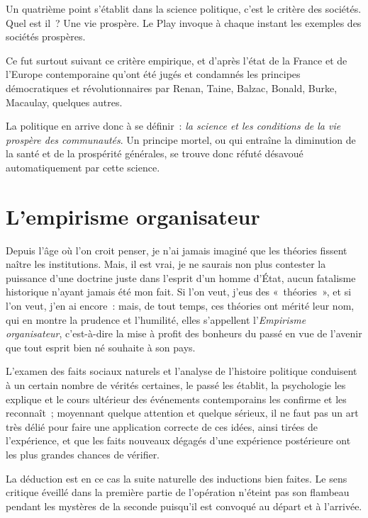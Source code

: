 \documentclass[french,twoside]{book} %
\newcommand{\astermono}{\medskip\centerline{\color{rubric}\large\selectfont{\syms ✻}}\medskip\par}%
\begin{document}
\astermono

\noindent Un quatrième point s’établit dans la science politique, c’est le critère des sociétés. Quel est il ? Une vie prospère. Le Play invoque à chaque instant les exemples des sociétés prospères.\par
Ce fut surtout suivant ce critère empirique, et d’après l’état de la France et de l’Europe contemporaine qu’ont été jugés et condamnés les principes démocratiques et révolutionnaires par Renan, Taine, Balzac, Bonald, Burke, Macaulay, quelques autres.\par
La politique en arrive donc à se définir : \emph{la science et les conditions de la vie prospère des communautés}. Un principe mortel, ou qui entraîne la diminution de la santé et de la prospérité générales, se trouve donc réfuté désavoué automatiquement par cette science.
\section[L’empirisme organisateur]{L’empirisme organisateur}
\noindent Depuis l’âge où l’on croit penser, je n’ai jamais imaginé que les théories fissent naître les institutions. Mais, il est vrai, je ne saurais non plus contester la puissance d’une doctrine juste dans l’esprit d’un homme d’État, aucun fatalisme historique n’ayant jamais été mon fait. Si l’on veut, j’eus des « théories », et si l’on veut, j’en ai encore : mais, de tout temps, ces théories ont mérité leur nom, qui en montre la prudence et l’humilité, elles s’appellent l’\emph{Empirisme organisateur}, c’est-à-dire la mise à profit des bonheurs du passé en vue de l’avenir que tout esprit bien né souhaite à son pays.\par
L’examen des faits sociaux naturels et l’analyse de l’histoire politique conduisent à un certain nombre de vérités certaines, le passé les établit, la psychologie les explique et le cours ultérieur des événements contemporains les confirme et les reconnaît ; moyennant quelque attention et quelque sérieux, il ne faut pas un art très délié pour faire une application correcte de ces idées, ainsi tirées de l’expérience, et que les faits nouveaux dégagés d’une expérience postérieure ont les plus grandes chances de vérifier.\par
La déduction est en ce cas la suite naturelle des inductions bien faites. Le sens critique éveillé dans la première partie de l’opération n’éteint pas son flambeau pendant les mystères de la seconde puisqu’il est convoqué au départ et à l’arrivée.\par
\end{document}
